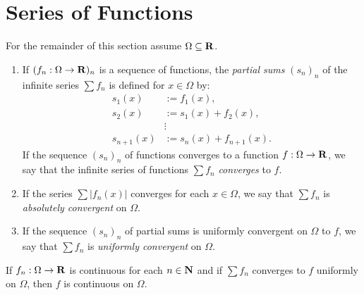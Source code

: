\section{Series of Functions}
    For the remainder of this section assume $\Omega \subseteq \mathbf{R}$.
    \begin{definition}
        \phantom{a}
        \begin{enumerate}[label = (\arabic*),itemsep=1pt,topsep=3pt]
            \item If $(f_n:\Omega \rightarrow \mathbf{R})_n$ is a sequence of functions, the \textit{partial sums} $(s_n)_n$ of the infinite series $\sum f_n$ is defined for $x \in \Omega$ by:
                \begin{equation*}
                \begin{split}
                    s_1(x) &:= f_1(x), \\
                    s_2(x) &:= s_1(x) + f_2(x), \\
                    &\vdots \\
                    s_{n+1}(x) &:= s_n(x) + f_{n+1}(x).
                \end{split}
                \end{equation*}
            If the sequence $(s_n)_n$ of functions converges to a function $f:\Omega \rightarrow \mathbf{R}$, we say that the infinite series of functions $\sum f_n$ \textit{converges} to $f$.

            \item If the series $\sum \left| f_n(x) \right|$ converges for each $x \in \Omega$, we say that $\sum f_n$ is \textit{absolutely convergent} on $\Omega$.
            \item If the sequence $(s_n)_n$ of partial sums is uniformly convergent on $\Omega$ to $f$, we say that $\sum f_n$ is \textit{uniformly convergent} on $\Omega$.
        \end{enumerate}
    \end{definition}

    \begin{theorem}
        If $f_n:\Omega \rightarrow \mathbf{R}$ is continuous for each $n \in \mathbf{N}$ and if $\sum f_n$ converges to $f$ uniformly on $\Omega$, then $f$ is continuous on $\Omega$.
    \end{theorem}